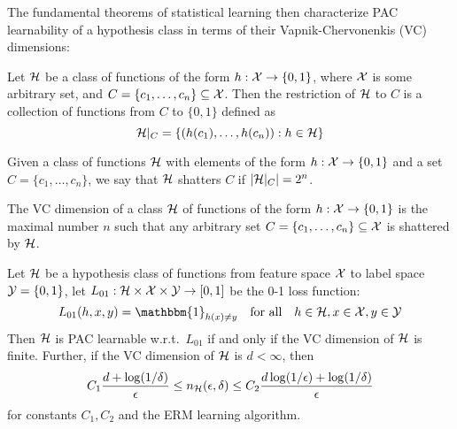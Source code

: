 The fundamental theorems of statistical learning then characterize PAC
learnability of a hypothesis class in terms of their Vapnik-Chervonenkis (VC)
dimensions:

\begin{definition}
  Let $\mathcal{H}$ be a class of functions of the form $h : \mathcal{X} \to \{0, 1\}$, where
  $\mathcal{X}$ is some arbitrary set, and $C = \{c_1, \ldots, c_n\} \subseteq \mathcal{X}$.
  Then the restriction of $\mathcal{H}$ to $C$ is a collection of functions from $C$ to
  $\{0, 1\}$ defined as
  \begin{equation}
    \mathcal{H}\vert_C = \{(h(c_1), \ldots, h(c_n)) : h \in \mathcal{H}\}
  \end{equation}
\end{definition}

\begin{definition}
  Given a class of functions $\mathcal{H}$ with elements of the form $h : \mathcal{X} \to \{0,
  1\}$ and a set $C = \{c_1, \ldots, c_n\}$, we say that $\mathcal{H}$ shatters $C$ if
  $\lvert\mathcal{H}\vert_C\rvert = 2^n$.
\end{definition}

\begin{definition}
  The VC dimension of a class $\mathcal{H}$ of functions of the form $h : \mathcal{X} \to \{0,
  1\}$ is the maximal number $n$ such that any arbitrary set $C = \{c_1, \ldots,
  c_n\} \subseteq \mathcal{X}$ is shattered by $\mathcal{H}$.
\end{definition}

\begin{theorem}
  \label{thm:fundamental}
  Let $\mathcal{H}$ be a hypothesis class of functions from feature space $\mathcal{X}$ to label
  space $\mathcal{Y} = \{0, 1\}$, let $L_{01} : \mathcal{H} \times \mathcal{X} \times \mathcal{Y} \to [0, 1]$ be
  the 0-1 loss function:
  \begin{equation}
    L_{01}(h, x, y) = \mathbbm{1}_{h(x) \neq y} \quad \text{for all} \quad h \in
    \CH, x \in \CX, y \in \CY
  \end{equation}
  Then $\mathcal{H}$ is PAC learnable w.r.t.\ $L_{01}$ if and only if the VC dimension
  of $\mathcal{H}$ is finite. Further, if the VC dimension of $\mathcal{H}$ is $d < \infty$,
  then
  \begin{equation}
    C_1 \frac{d + \log(1 / \delta)}{\epsilon} \leq n_{\mathcal{H}}(\epsilon, \delta) \leq
    C_2 \frac{d \log(1 / \epsilon) + \log(1 / \delta)}{\epsilon}
  \end{equation}
  for constants $C_1, C_2$ and the ERM learning algorithm.
\end{theorem}

